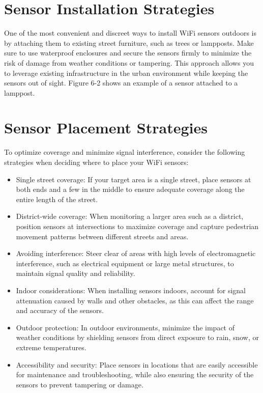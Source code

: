 \documentclass[
  letterpaper,
]{scrbook}
\providecommand{\tightlist}{%
  \setlength{\itemsep}{0pt}\setlength{\parskip}{0pt}}\usepackage{longtable,booktabs,array}
\begin{document}
\section{Sensor Installation
Strategies}\label{sensor-installation-strategies}

One of the most convenient and discreet ways to install WiFi sensors
outdoors is by attaching them to existing street furniture, such as
trees or lampposts. Make sure to use waterproof enclosures and secure
the sensors firmly to minimize the risk of damage from weather
conditions or tampering. This approach allows you to leverage existing
infrastructure in the urban environment while keeping the sensors out of
sight. Figure 6-2 shows an example of a sensor attached to a lamppost.

\section{Sensor Placement Strategies}\label{sensor-placement-strategies}

To optimize coverage and minimize signal interference, consider the
following strategies when deciding where to place your WiFi sensors:

\begin{itemize}
\tightlist
\item
  Single street coverage: If your target area is a single street, place
  sensors at both ends and a few in the middle to ensure adequate
  coverage along the entire length of the street.
\item
  District-wide coverage: When monitoring a larger area such as a
  district, position sensors at intersections to maximize coverage and
  capture pedestrian movement patterns between different streets and
  areas.
\item
  Avoiding interference: Steer clear of areas with high levels of
  electromagnetic interference, such as electrical equipment or large
  metal structures, to maintain signal quality and reliability.
\item
  Indoor considerations: When installing sensors indoors, account for
  signal attenuation caused by walls and other obstacles, as this can
  affect the range and accuracy of the sensors.
\item
  Outdoor protection: In outdoor environments, minimize the impact of
  weather conditions by shielding sensors from direct exposure to rain,
  snow, or extreme temperatures.
\item
  Accessibility and security: Place sensors in locations that are easily
  accessible for maintenance and troubleshooting, while also ensuring
  the security of the sensors to prevent tampering or damage.
\end{itemize}
\end{document}
